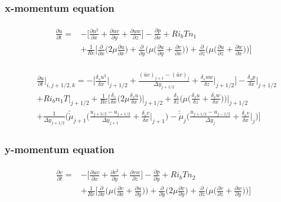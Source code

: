 \documentclass[preprint,12pt]{article}
\begin{document}
\subsubsection{x-momentum equation}
\begin{align}	\begin{split}
\frac{\partial u}{\partial t}=&-\Bigg[\frac{\partial u^2}{\partial x}+\frac{\partial uv}{\partial y}+\frac{\partial uw}{\partial z}\Bigg]-\frac{\partial p}{\partial x}+Ri_bT n_1\\&+\frac{1}{Re}\Bigg[\frac{\partial }{\partial x}\Bigg(2\mu\frac{\partial u}{\partial x}\Bigg)+\frac{\partial }{\partial y}\Bigg(\mu\Big(\frac{\partial u}{\partial y}+\frac{\partial v}{\partial x}\Big)\Bigg)+\frac{\partial }{\partial z}\Bigg(\mu\Big(\frac{\partial u}{\partial z}+\frac{\partial w}{\partial x}\Big)\Bigg)\Bigg]
\end{split}	\end{align}

\begin{align}	\begin{split}
&\frac{\partial u}{\partial t}\Bigg|_{i,j+1/2,k}=-\Bigg[\frac{\delta_s u^2}{\delta x}\Bigg|_{j+1/2}+\frac{(\bar{u}v)_{j+1}-(\bar{u}v)_{j}}{\Delta y_{j+1/2}}+\frac{\delta_s uw}{\delta z}\Bigg|_{j+1/2}\Bigg]-\frac{\delta_s p}{\delta x}\Bigg|_{j+1/2}\\&+Ri_bn_1T|_{j+1/2} +\frac{1}{Re}\Bigg[\frac{\delta_s }{\delta x}\Big(2\mu\frac{\delta_s u}{\delta x}\Big)\Bigg|_{j+1/2}+\frac{\delta_s }{\delta z}\Bigg(\mu\Big(\frac{\delta_s u}{\delta z}+\frac{\delta_s w}{\delta x}\Big)\Bigg)\Bigg|_{j+1/2}\\&+\frac{1}{\Delta y_{j+1/2}}\Bigg(\check{\check{\mu}}_{j+1}\Bigg(\frac{u_{j+3/2}-u_{j+1/2}}{\Delta y_{j+1}}+\frac{\delta_s v}{\delta x}\Bigg|_{j+1}\Bigg)-\check{\check{\mu}}_{j}\Bigg(\frac{u_{j+1/2}-u_{j-1/2}}{\Delta y_{j}}+\frac{\delta_s v}{\delta x}\Bigg|_{j}\Bigg)\Bigg] 
\end{split}	\end{align} 

\subsubsection{y-momentum equation}
\begin{align}	\begin{split}
\frac{\partial v}{\partial t}=&-\Bigg[\frac{\partial uv}{\partial x}+\frac{\partial v^2}{\partial y}+\frac{\partial vw}{\partial z}\Bigg]-\frac{\partial p}{\partial y}+Ri_bT n_2\\&+\frac{1}{Re}\Bigg[\frac{\partial }{\partial x}\Big(\mu\Big(\frac{\partial v}{\partial x}+\frac{\partial u}{\partial y}\Big)\Big)+\frac{\partial }{\partial y}\Bigg(2\mu\frac{\partial v}{\partial y}\Bigg)+\frac{\partial }{\partial z}\Bigg(\mu\Big(\frac{\partial v}{\partial z}+\frac{\partial w}{\partial y}\Big)\Bigg)\Bigg]
\end{split}	\end{align}
\end{document}

